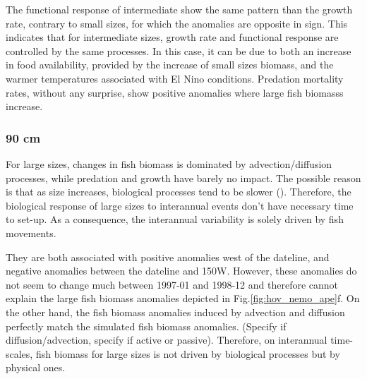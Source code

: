 The functional response of intermediate show the same pattern than the growth rate, contrary to small sizes, for which the anomalies are opposite in sign. This indicates that for intermediate sizes, growth rate and functional response are controlled by the same processes. In this case, it can be due to both an increase in food availability, provided by the increase of small sizes biomass, and the warmer temperatures associated with El Nino conditions. Predation mortality rates, without any surprise, show positive anomalies where large fish biomasss increase.

\subsubsection{90 cm}

For large sizes, changes in fish biomass is dominated by advection/diffusion processes, while predation and growth have barely no impact. The possible reason is that as size increases, biological processes tend to be slower (). Therefore, the biological response of large sizes to interannual events don't have necessary time to set-up. As a consequence, the interannual variability is solely driven by fish movements.

They are both associated with positive anomalies west of the dateline, and negative anomalies between the dateline and 150W. However, these anomalies do not seem to change much between 1997-01 and 1998-12 and therefore cannot explain the large fish biomass anomalies depicted in Fig.\ref{fig:hov_nemo_ape}f. On the other hand, the fish biomass anomalies induced by advection and diffusion perfectly match the simulated fish biomass anomalies. \warn(Specify if diffusion/advection, specify if active or passive). Therefore, on interannual time-scales, fish biomass for large sizes is not driven by biological processes but by physical ones.

